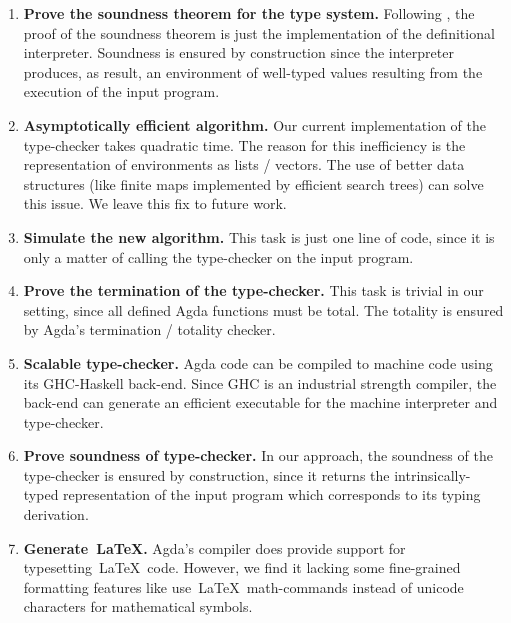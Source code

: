 \documentclass[review]{elsarticle}
\theoremstyle{definition}
\begin{document}
\begin{enumerate}
  \item \textbf{Prove the soundness theorem for the type system.} Following \cite{Amin17}, the proof of the soundness
        theorem is just the implementation of the definitional interpreter. Soundness is ensured by construction since the interpreter
        produces, as result, an environment of well-typed values resulting from the execution of the input program.
  \item \textbf{Asymptotically efficient algorithm.} Our current implementation of the type-checker takes quadratic time. The reason
        for this inefficiency is the representation of environments as lists / vectors. The use of better data structures (like finite
        maps implemented by efficient search trees) can solve this issue. We leave this fix to future work.
  \item \textbf{Simulate the new algorithm.} This task is just one line of code, since it is only a matter of calling the type-checker
        on the input program.
  \item \textbf{Prove the termination of the type-checker.} This task is trivial in our setting, since all defined Agda functions
        must be total. The totality is ensured by Agda's termination / totality checker.
  \item \textbf{Scalable type-checker.} Agda code can be compiled to machine code using its GHC-Haskell back-end. Since GHC is
        an industrial strength compiler, the back-end can generate an efficient executable for the machine interpreter and type-checker.
  \item \textbf{Prove soundness of type-checker.} In our approach, the soundness of the type-checker is ensured by construction,
        since it returns the intrinsically-typed representation of the input program which corresponds to its typing derivation.
  \item \textbf{Generate~\LaTeX.} Agda's compiler does provide support for typesetting~\LaTeX~code.
        However, we find it lacking some fine-grained formatting features like use~\LaTeX~math-commands instead of
        unicode characters for mathematical symbols.
\end{enumerate}
\end{document}

